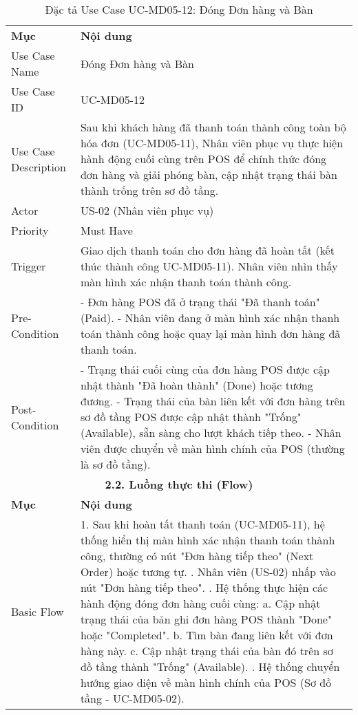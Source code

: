 \begin{longtable}{|m{4cm}|p{11cm}|}
\caption{Đặc tả Use Case UC-MD05-12: Đóng Đơn hàng và Bàn} \label{tab:uc_md05_12} \\
\hline

\endhead %
\hline
\endfoot %
\hline
\endlastfoot %
\multicolumn{2}{|c|}{\textbf{2.1. Tóm tắt (Summary)}} \\
\hline
\textbf{Mục} & \textbf{Nội dung} \\
\hline
Use Case Name & Đóng Đơn hàng và Bàn \\
\hline
Use Case ID & UC-MD05-12 \\
\hline
Use Case Description & Sau khi khách hàng đã thanh toán thành công toàn bộ hóa đơn (UC-MD05-11), Nhân viên phục vụ thực hiện hành động cuối cùng trên POS để chính thức đóng đơn hàng và giải phóng bàn, cập nhật trạng thái bàn thành trống trên sơ đồ tầng. \\
\hline
Actor & US-02 (Nhân viên phục vụ) \\
\hline
Priority & Must Have \\
\hline
Trigger & Giao dịch thanh toán cho đơn hàng đã hoàn tất (kết thúc thành công UC-MD05-11). Nhân viên nhìn thấy màn hình xác nhận thanh toán thành công. \\
\hline
Pre-Condition & - Đơn hàng POS đã ở trạng thái "Đã thanh toán" (Paid). \newline - Nhân viên đang ở màn hình xác nhận thanh toán thành công hoặc quay lại màn hình đơn hàng đã thanh toán. \\
\hline
Post-Condition & - Trạng thái cuối cùng của đơn hàng POS được cập nhật thành "Đã hoàn thành" (Done) hoặc tương đương. \newline - Trạng thái của bàn liên kết với đơn hàng trên sơ đồ tầng POS được cập nhật thành "Trống" (Available), sẵn sàng cho lượt khách tiếp theo. \newline - Nhân viên được chuyển về màn hình chính của POS (thường là sơ đồ tầng). \\
\hline
\multicolumn{2}{|c|}{\textbf{2.2. Luồng thực thi (Flow)}} \\
\hline
\textbf{Mục} & \textbf{Nội dung} \\
\hline
Basic Flow & 1. Sau khi hoàn tất thanh toán (UC-MD05-11), hệ thống hiển thị màn hình xác nhận thanh toán thành công, thường có nút "Đơn hàng tiếp theo" (Next Order) hoặc tương tự. \newline 2. Nhân viên (US-02) nhấp vào nút "Đơn hàng tiếp theo". \newline 3. Hệ thống thực hiện các hành động đóng đơn hàng cuối cùng: \newline    a. Cập nhật trạng thái của bản ghi đơn hàng POS thành "Done" hoặc "Completed". \newline    b. Tìm bàn đang liên kết với đơn hàng này. \newline    c. Cập nhật trạng thái của bàn đó trên sơ đồ tầng thành "Trống" (Available). \newline 4. Hệ thống chuyển hướng giao diện về màn hình chính của POS (Sơ đồ tầng - UC-MD05-02). \\

\end{longtable}
